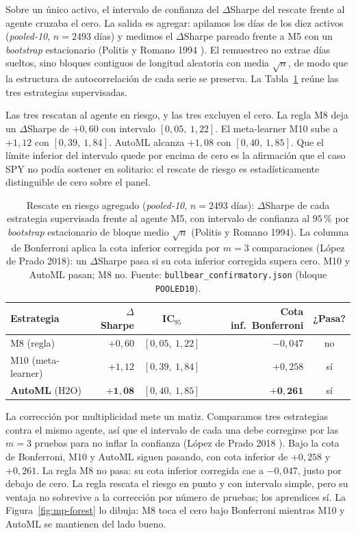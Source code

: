 Sobre un único activo, el intervalo de confianza del $\Delta$Sharpe del rescate frente al agente cruzaba el cero. La salida es agregar: apilamos los días de los diez activos (\emph{pooled-10}, $n = 2493$ días) y medimos el $\Delta$Sharpe pareado frente a M5 con un \emph{bootstrap} estacionario (Politis y Romano 1994 \cite{politis1994}). El remuestreo no extrae días sueltos, sino bloques contiguos de longitud aleatoria con media $\sqrt{n}$, de modo que la estructura de autocorrelación de cada serie se preserva. La Tabla~\ref{tab:mp-pooled} reúne las tres estrategias supervisadas.

Las tres rescatan al agente en riesgo, y las tres excluyen el cero. La regla M8 deja un $\Delta$Sharpe de $+0{,}60$ con intervalo $[0{,}05,\ 1{,}22]$. El meta-learner M10 sube a $+1{,}12$ con $[0{,}39,\ 1{,}84]$. AutoML alcanza $+1{,}08$ con $[0{,}40,\ 1{,}85]$. Que el límite inferior del intervalo quede por encima de cero es la afirmación que el caso SPY no podía sostener en solitario: el rescate de riesgo es estadísticamente distinguible de cero sobre el panel.

\begin{table}[htbp]
\centering
\caption{Rescate en riesgo agregado (\emph{pooled-10}, $n = 2493$ días): $\Delta$Sharpe de cada estrategia supervisada frente al agente M5, con intervalo de confianza al $95\,\%$ por \emph{bootstrap} estacionario de bloque medio $\sqrt{n}$ (Politis y Romano 1994). La columna de Bonferroni aplica la cota inferior corregida por $m = 3$ comparaciones (López de Prado 2018): un $\Delta$Sharpe pasa si su cota inferior corregida supera cero. M10 y AutoML pasan; M8 no. Fuente: \texttt{bullbear\_confirmatory.json} (bloque \texttt{POOLED10}).}
\label{tab:mp-pooled}
\begin{tabular}{lrcrc}
\toprule
Estrategia & $\Delta$Sharpe & IC$_{95}$ & Cota inf.\ Bonferroni & ¿Pasa? \\
\midrule
M8 (regla)            & $+0{,}60$ & $[0{,}05,\ 1{,}22]$ & $-0{,}047$ & no \\
M10 (meta-learner)    & $+1{,}12$ & $[0{,}39,\ 1{,}84]$ & $+0{,}258$ & sí \\
\textbf{AutoML} (H2O) & $\mathbf{+1{,}08}$ & $[0{,}40,\ 1{,}85]$ & $\mathbf{+0{,}261}$ & sí \\
\bottomrule
\end{tabular}
\end{table}

La corrección por multiplicidad mete un matiz. Comparamos tres estrategias contra el mismo agente, así que el intervalo de cada una debe corregirse por las $m = 3$ pruebas para no inflar la confianza (López de Prado 2018 \cite{lopezdeprado2018}). Bajo la cota de Bonferroni, M10 y AutoML siguen pasando, con cota inferior de $+0{,}258$ y $+0{,}261$. La regla M8 no pasa: su cota inferior corregida cae a $-0{,}047$, justo por debajo de cero. La regla rescata el riesgo en punto y con intervalo simple, pero su ventaja no sobrevive a la corrección por número de pruebas; los aprendices sí. La Figura~\ref{fig:mp-forest} lo dibuja: M8 toca el cero bajo Bonferroni mientras M10 y AutoML se mantienen del lado bueno.

